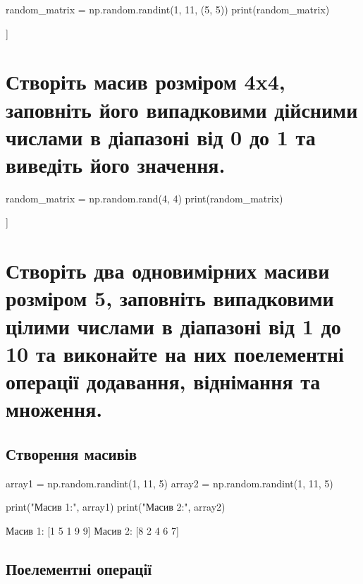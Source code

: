 \documentclass[]{article}
\newcounter{pythoncode}
\begin{document}
\begin{pythoncode}
    random_matrix = np.random.randint(1, 11, (5, 5))
    print(random_matrix)
\end{pythoncode}

\begin{out}
	[[ 7 10  4  6  7]
	 [ 1 10  1  1 10]
	 [10  9 10  6  3]
	 [10  7  9  6  6]
	 [ 9  2  4  4  4]]
\end{out}

\section{Створіть масив розміром 4x4, заповніть його випадковими дійсними числами в діапазоні від 0 до 1 та виведіть його значення.}

\begin{pythoncode}
    random_matrix = np.random.rand(4, 4)
    print(random_matrix)
\end{pythoncode}

\begin{out}
	[[0.34716231 0.38666569 0.60847232 0.44947206]
	 [0.28441679 0.24889235 0.69068513 0.44390396]
	 [0.45757561 0.30179135 0.30334876 0.14319334]
	 [0.19297175 0.18552924 0.3236188  0.56707376]]
\end{out}

\section{Створіть два одновимірних масиви розміром 5, заповніть  	випадковими цілими числами в діапазоні від 1 до 10 та виконайте на них 	поелементні операції додавання, віднімання та множення.}

\subsection{Створення масивів}

\begin{pythoncode}
    array1 = np.random.randint(1, 11, 5)
    array2 = np.random.randint(1, 11, 5)

    print("Масив 1:", array1)
    print("Масив 2:", array2)
\end{pythoncode}

\begin{out}
	Масив 1: [1 5 1 9 9]
	Масив 2: [8 2 4 6 7]
\end{out}

\subsection{Поелементні операції}
\end{document}
